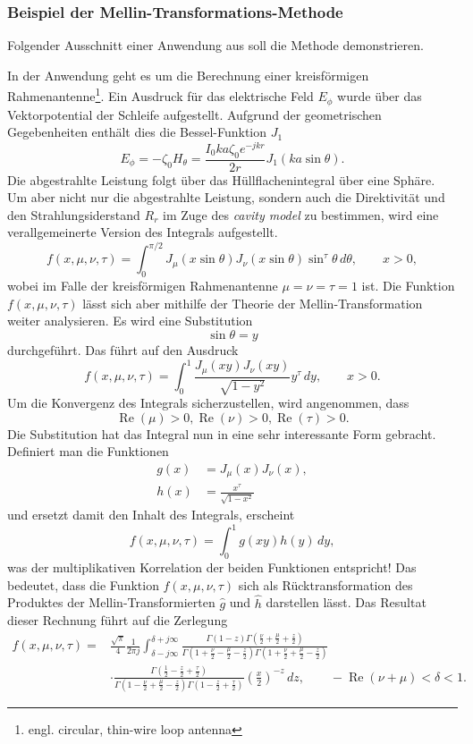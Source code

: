 \subsubsection{Beispiel der Mellin-Transformations-Methode}
Folgender Ausschnitt einer Anwendung aus\cite{mellin:mellin-transform-method} 
soll die Methode demonstrieren.

In der Anwendung geht es um die Berechnung einer 
kreisförmigen Rahmenantenne\footnote{engl. circular, thin-wire loop antenna}.
Ein Ausdruck für das elektrische Feld $E_\phi $ wurde über das Vektorpotential 
der Schleife aufgestellt.
Aufgrund der geometrischen Gegebenheiten enthält dies die Bessel-Funktion $J_1$
\[
    E_\phi 
    = -\zeta_0 H_\theta  
    = \frac{I_0ka\zeta_0e^{-jkr}}{2r} J_1(ka \sin\theta)
    .
\]
Die abgestrahlte Leistung folgt über das Hüllflachenintegral über eine Sphäre.
Um aber nicht nur die abgestrahlte Leistung, sondern auch die Direktivität und 
den Strahlungsiderstand $R_r$ im Zuge des {\em cavity model} zu bestimmen, wird eine 
verallgemeinerte Version des Integrals aufgestellt.
\[
    f(x, \mu, \nu, \tau)
    = \int_{0}^{\pi/2} J_\mu(x \sin\theta) J_\nu(x \sin\theta) \sin^\tau \theta \,d\theta, \qquad x > 0 
    ,
\]
wobei im Falle der kreisförmigen Rahmenantenne $\mu = \nu = \tau = 1$ ist.
Die Funktion $f(x, \mu, \nu, \tau)$ lässt sich aber mithilfe der Theorie 
der Mellin-Transformation weiter analysieren.
Es wird eine Substitution
\[
    \sin\theta = y
\]
durchgeführt.
Das führt auf den Ausdruck
\[
    f(x, \mu, \nu, \tau)
    = \int_{0}^{1} \frac{J_\mu(xy) J_\nu(xy)}{\sqrt{1-y^2}} y^\tau \,dy, \qquad x > 0 
    .
\]
Um die Konvergenz des Integrals sicherzustellen, wird angenommen, dass
\[
    \operatorname{Re}(\mu) > 0,
    \operatorname{Re}(\nu) > 0,
    \operatorname{Re}(\tau) > 0.
\]
Die Substitution hat das Integral nun in eine sehr interessante Form gebracht.
Definiert man die Funktionen 
\begin{align*}
    g(x) &= J_\mu(x)J_\nu(x), \\
    h(x) &= \frac{x^\tau}{\sqrt{1-x^2}} 
\end{align*}
und ersetzt damit den Inhalt des Integrals, erscheint
\[
    f(x, \mu, \nu, \tau)
    = \int_{0}^{1} g(xy) h(y) \,dy, 
\]
was der multiplikativen Korrelation der beiden Funktionen entspricht!
Das bedeutet, dass die Funktion $f(x, \mu, \nu, \tau)$ sich als 
Rücktransformation des Produktes der Mellin-Transformierten $\hat{g}$ 
und $\hat{h}$ darstellen lässt.
Das Resultat dieser Rechnung führt auf die Zerlegung 
\begin{align*}
    f(x, \mu, \nu, \tau)
    = &\frac{\sqrt{\pi}}{4} \frac{1}{2\pi j} \int_{\delta -j\infty}^{\delta +j\infty} 
    \frac{\Gamma(1 - z)\Gamma(\frac{\nu}{2}+\frac{\mu}{2}+\frac{z}{2})}{\Gamma(1+\frac{\nu}{2}-\frac{\mu}{2}-\frac{z}{2}) \Gamma(1+\frac{\nu}{2}+\frac{\mu}{2}-\frac{z}{2})} \\
    &\cdot \frac{\Gamma(\frac{1}{2}-\frac{z}{2}+\frac{\tau}{2})}{\Gamma(1-\frac{\nu}{2}+\frac{\mu}{2}-\frac{z}{2})\Gamma(1-\frac{z}{2}+\frac{\tau}{2})} \left(\frac{x}{2}\right)^{-z} \,dz,
    \qquad -\operatorname{Re}(\nu + \mu) < \delta < 1
    .
\end{align*}
